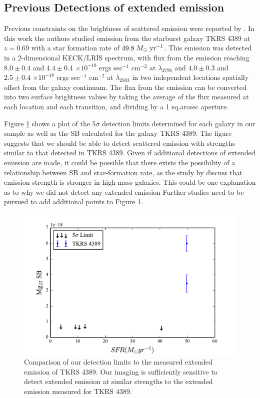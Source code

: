 \documentclass[twocolumn]{aastex61}
\def \msunperyr {{\; M_{\odot}\rm \;yr^{-1}}}
\begin{document}
\subsection{Previous Detections of extended  emission}
Previous constraints on the brightness of scattered  emission were reported by \cite{Rubin_2011}. In this work the authors studied emission from the starburst galaxy TKRS 4389 at $z = 0.69$ with a star formation rate of $49.8\msunperyr$. This emission was detected in a 2-dimensional KECK/LRIS spectrum, with flux from the emission reaching $8.0 \pm 0.4$ and $4.4 \pm 0.4$ $\times10^{-18}$ ergs sec$^{-1}$ cm$^{-2}$ at  $\lambda _{2796}$ and $4.0 \pm 0.3$ and $2.5 \pm 0.4$ $\times10^{-18}$ ergs sec$^{-1}$ cm$^{-2}$ at $\lambda_{2803}$ in two independent locations spatially offset from the galaxy continuum. The flux from the emission can be converted into two surface brightness values by taking the average of the flux measured at each location and each transition, and dividing by a 1 sq.arcsec aperture. 

Figure \ref{fig:detection_lim} shows a plot of the 5$\sigma$ detection limits determined for each galaxy in our sample as well as the SB calculated for the galaxy TKRS 4389. The figure suggests that we should be able to detect scattered  emission with strengths similar to that detected in TKRS 4389. Given if  additional detections of extended  emission are made, it could be possible that there exists the possibility of a relationship between SB and star-formation rate, as the study by \cite{Erb2012} discuss that emission strength is stronger in high mass galaxies. This could be one explanation as to why we did not detect any extended  emission Further studies need to be pursued to add additional points to Figure \ref{fig:detection_lim}.

\begin{figure}[!htb]
\centering
\includegraphics[scale=0.6]{../Figures/limits.pdf}
\caption{Comparison of our detection limits to the measured extended emission of TKRS 4389. Our imaging is sufficiently sensitive to detect extended emission at similar strengths to the extended emission measured for TKRS 4389.}
\label{fig:detection_lim}
\end{figure}
\end{document}
